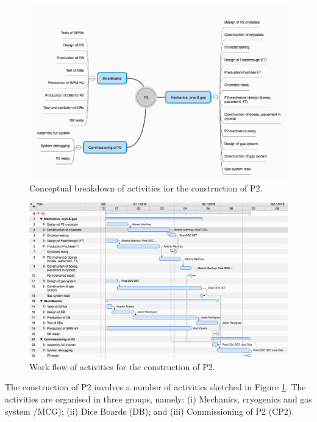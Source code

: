 \begin{figure}[!htb]
	\centering
	\includegraphics[scale=0.5]{img/P2MIND.png}
	\caption{\label{fig.P2MIND} Conceptual breakdown of activities for the construction of P2.  }
\end{figure}

\begin{figure}[!htb]
	\centering
	\includegraphics[scale=0.5]{img/P2WF.png}
	\caption{\label{fig.P2WF} Work flow of activities for the construction of P2.  }
\end{figure}

The construction of P2 involves a number of activities sketched in Figure \ref{fig.P2MIND}. The activities are organised in three groups, namely: (i) Mechanics, cryogenics and gas system /MCG);  (ii) Dice Boards (DB);  and (iii) Commissioning of P2 (CP2). 

